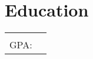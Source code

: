 \documentclass[letterpaper,11pt]{article}
\makeatletter
\newcommand{\org}[4]{
  \begin{tabular*}{\textwidth}{@{\extracolsep{\fill}} l r}
    \bfseries{#1} & #2 \\
    \small #3 & \small #4 \\
  \end{tabular*}
}
\newcommand{\items}{\begin{itemize}[leftmargin=*]}
\newcommand{\itemsEnd}{\end{itemize}}
\makeatother
\begin{document}
\section{Education}
  \org
    {\VAR{uni.name}}{\VAR{uni.loc}}
    {GPA: \VAR{uni.gpa}}{\VAR{uni.date}}
    \items
      \begin{minipage}[t]{0.6\linewidth}
        \vspace{-2pt}
        \item {}
      \end{minipage}
      \hspace{0.04\linewidth}
      \begin{minipage}[t]{0.35\linewidth}
        \vspace{-2pt}
        \item {}
      \end{minipage}
    \itemsEnd
\end{document}
